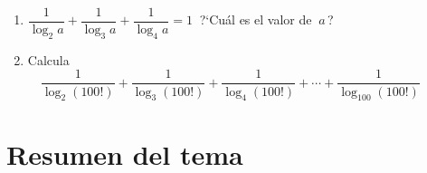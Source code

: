 \begin{enumerate}
\vspace{-6mm}
\begin{flushright}
\begin{footnotesize} \textcolor{gris}{}	\end{footnotesize}
\end{flushright}

\item $\dfrac{1}{\log_2 a}+\dfrac{1}{\log_3 a}+\dfrac{1}{\log_4 a}=1\ $ ?`Cuál es el valor de $\ a\, $?

\vspace{-6mm}
\begin{flushright}
\begin{footnotesize} \textcolor{gris}{}	\end{footnotesize}
\end{flushright}

\item Calcula $\quad \dfrac{1}{\log_2(100!)}+\dfrac{1}{\log_3(100!)}+\dfrac{1}{\log_4(100!)}+\cdots +\dfrac{1}{\log_100(100!)}$

\vspace{-4mm}
\begin{flushright}
\begin{footnotesize} \textcolor{gris}{}	\end{footnotesize}
\end{flushright}

\end{enumerate}

\newpage

\section{Resumen del tema}
\vspace{0.5cm}

